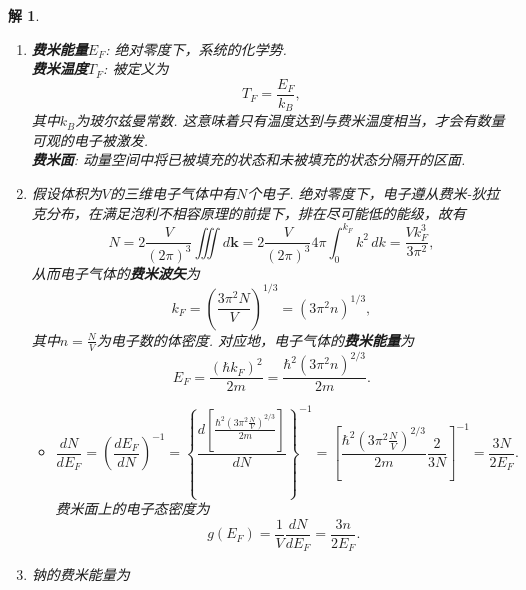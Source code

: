 \documentclass[UTF8,10pt,a4paper]{article}
\theoremstyle{Problem}
\theoremstyle{Solution}
\newtheorem*{sol}{解}
\begin{document}
\begin{sol}
    \begin{enumerate}
        \item[(a)] \textbf{费米能量$E_F$}: 绝对零度下，系统的化学势.\\
        \textbf{费米温度$T_F$}: 被定义为
        \begin{equation}
            T_F=\frac{E_F}{k_B},
        \end{equation}
        其中$k_B$为玻尔兹曼常数. 这意味着只有温度达到与费米温度相当，才会有数量可观的电子被激发.\\
        \textbf{费米面}: 动量空间中将已被填充的状态和未被填充的状态分隔开的区面.
        \item[(b)] 假设体积为$V$的三维电子气体中有$N$个电子. 绝对零度下，电子遵从费米-狄拉克分布，在满足泡利不相容原理的前提下，排在尽可能低的能级，故有
        \begin{equation}
            N=2\frac{V}{(2\pi)^3}\iiint d\bm{k}=2\frac{V}{(2\pi)^3}4\pi\int_0^{k_F}k^2\,dk=\frac{Vk_F^3}{3\pi^2},
        \end{equation}
        从而电子气体的\textbf{费米波矢}为
        \begin{equation}
            k_F=\left(\frac{3\pi^2N}{V}\right)^{1/3}=(3\pi^2n)^{1/3},
        \end{equation}
        其中$n=\frac{N}{V}$为电子数的体密度.
        对应地，电子气体的\textbf{费米能量}为
        \begin{equation}
            E_F=\frac{(\hbar k_F)^2}{2m}=\frac{\hbar^2(3\pi^2n)^{2/3}}{2m}.
        \end{equation}
        \begin{itemize}
            \item[$\triangleright$]
            \begin{equation}
                \frac{dN}{dE_F}=\left(\frac{dE_F}{dN}\right)^{-1}=\left\{\frac{d\left[\frac{\hbar^2\left(3\pi^2\frac{N}{V}\right)^{2/3}}{2m}\right]}{dN}\right\}^{-1}=\left[\frac{\hbar^2\left(3\pi^2\frac{N}{V}\right)^{2/3}}{2m}\frac{2}{3N}\right]^{-1}=\frac{3N}{2E_F}.
            \end{equation}
            费米面上的电子态密度为
            \begin{equation}
                g(E_F)=\frac{1}{V}\frac{dN}{dE_F}=\frac{3n}{2E_F}.
            \end{equation}
        \end{itemize}
        \item[(c)] 钠的费米能量为
        \begin{equation}

\end{equation}
\end{enumerate}
\end{sol}
\end{document}
